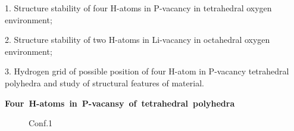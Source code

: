\documentclass[11pt]{article}
\begin{document}
1. Structure stability of four H-atoms in P-vacancy in tetrahedral oxygen environment;

2. Structure stability of two H-atoms in Li-vacancy in octahedral oxygen environment;

3. Hydrogen grid of possible position of four H-atom in P-vacancy tetrahedral polyhedra and study of structural features of material.

\noindent\mbox{\textbf{Four H-atoms in P-vacansy of tetrahedral polyhedra}}

\begin{figure}[H]
\begin{minipage}[h]{0.3\linewidth}
 Conf.1 \\
\end{minipage}
\hfill
\begin{minipage}[h]{0.3\linewidth}

\end{minipage}
\end{figure}
\end{document}
